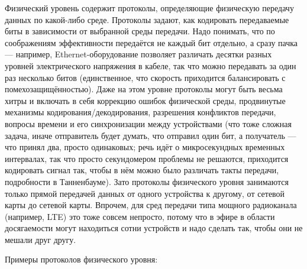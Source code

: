 \documentclass[a5paper]{article}
\begin{document}
Физический уровень содержит протоколы, определяющие физическую передачу данных по какой-либо среде. Протоколы задают, как кодировать передаваемые биты в зависимости от выбранной среды передачи. Надо понимать, что по соображениям эффективности передаётся не каждый бит отдельно, а сразу пачка --- например, Ethernet-оборудование позволяет различать десятки разных уровней электрического напряжения в кабеле, так что можно передавать за один раз несколько битов (единственное, что скорость приходится балансировать с помехозащищённостью). Даже на этом уровне протоколы могут быть весьма хитры и включать в себя коррекцию ошибок физической среды, продвинутые механизмы кодирования/декодирования, разрешения конфликтов передачи, вопросы времени и его синхронизации между устройствами (что тоже сложная задача, иначе отправитель будет думать, что отправил один бит, а получатель --- что принял два, просто одинаковых; речь идёт о микросекундных временных интервалах, так что просто секундомером проблемы не решаются, приходится кодировать сигнал так, чтобы в нём можно было различать такты передачи, подробности в Танненбауме). Зато протоколы физического уровня занимаются только прямой передачей данных от одного устройства к другому, от сетевой карты до сетевой карты. Впрочем, для сред передачи типа мощного радиоканала (например, LTE) это тоже совсем непросто, потому что в эфире в области досягаемости могут находиться сотни устройств и надо сделать так, чтобы они не мешали друг другу.

Примеры протоколов физического уровня:
\end{document}
